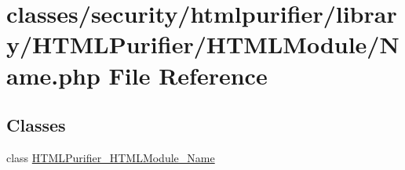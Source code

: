 \hypertarget{HTMLModule_2Name_8php}{\section{classes/security/htmlpurifier/library/\+H\+T\+M\+L\+Purifier/\+H\+T\+M\+L\+Module/\+Name.php File Reference}
\label{HTMLModule_2Name_8php}
}
\subsection*{Classes}
\begin{DoxyCompactItemize}
\item 
class \hyperlink{classHTMLPurifier__HTMLModule__Name}{H\+T\+M\+L\+Purifier\+\_\+\+H\+T\+M\+L\+Module\+\_\+\+Name}
\end{DoxyCompactItemize}
